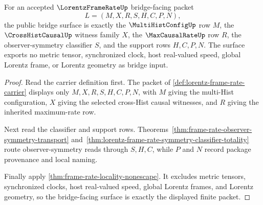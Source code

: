 \begin{theorem}
\label{thm:lorentz-frame-rate-standard-bridge-surface}
For an accepted $\LorentzFrameRateUp$ bridge-facing packet
$$
L=(M,X,R,S,H,C,P,N),
$$
the public bridge surface is exactly the $\MultiHistConfigUp$ row $M$, the $\CrossHistCausalUp$ witness family $X$, the $\MaxCausalRateUp$ row $R$, the observer-symmetry classifier $S$, and the support rows $H,C,P,N$. The surface exports no metric tensor, synchronized clock, host real-valued speed, global Lorentz frame, or Lorentz geometry as bridge input.
\end{theorem}
\begin{proof}
Read the carrier definition first. The packet of \autoref{def:lorentz-frame-rate-carrier} displays only $M,X,R,S,H,C,P,N$, with $M$ giving the multi-Hist configuration, $X$ giving the selected cross-Hist causal witnesses, and $R$ giving the inherited maximum-rate row.

Next read the classifier and support rows. Theorems~\ref{thm:frame-rate-observer-symmetry-transport} and~\ref{thm:lorentz-frame-rate-symmetry-classifier-totality} route observer-symmetry reads through $S,H,C$, while $P$ and $N$ record package provenance and local naming.

Finally apply \autoref{thm:frame-rate-locality-nonescape}. It excludes metric tensors, synchronized clocks, host real-valued speed, global Lorentz frames, and Lorentz geometry, so the bridge-facing surface is exactly the displayed finite packet.
\end{proof}

